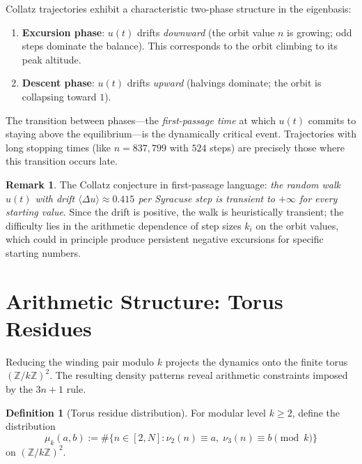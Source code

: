 \documentclass[11pt,a4paper]{article}
\newcommand{\Z}{\mathbb{Z}}
\theoremstyle{plain}
\theoremstyle{definition}
\newtheorem{definition}[theorem]{Definition}
\newtheorem{remark}[theorem]{Remark}
\begin{document}
\begin{keyinsight}
    Collatz trajectories exhibit a characteristic two-phase structure in the eigenbasis:
    \begin{enumerate}
        \item \textbf{Excursion phase}: $u(t)$ drifts \emph{downward} (the orbit value $n$ is growing; odd steps dominate the balance). This corresponds to the orbit climbing to its peak altitude.
        \item \textbf{Descent phase}: $u(t)$ drifts \emph{upward} (halvings dominate; the orbit is collapsing toward $1$).
    \end{enumerate}
    The transition between phases---the \emph{first-passage time} at which $u(t)$ commits to staying above the equilibrium---is the dynamically critical event. Trajectories with long stopping times (like $n = 837{,}799$ with $524$ steps) are precisely those where this transition occurs late.
\end{keyinsight}

\begin{remark}
    The Collatz conjecture in first-passage language: \emph{the random walk $u(t)$ with drift $\langle \Delta u \rangle \approx 0.415$ per Syracuse step is transient to $+\infty$ for every starting value}. Since the drift is positive, the walk is heuristically transient; the difficulty lies in the arithmetic dependence of step sizes $k_i$ on the orbit values, which could in principle produce persistent negative excursions for specific starting numbers.
\end{remark}


\section{Arithmetic Structure: Torus Residues}\label{sec:arithmetic}

Reducing the winding pair modulo $k$ projects the dynamics onto the finite torus $(\Z/k\Z)^2$. The resulting density patterns reveal arithmetic constraints imposed by the $3n+1$ rule.

\begin{definition}[Torus residue distribution]
    For modular level $k \geq 2$, define the distribution
    \begin{equation}
        \mu_k(a, b) := \#\{n \in [2, N] : \nu_2(n) \equiv a,\; \nu_3(n) \equiv b \pmod{k}\}
    \end{equation}
    on $(\Z/k\Z)^2$.
\end{definition}
\end{document}
